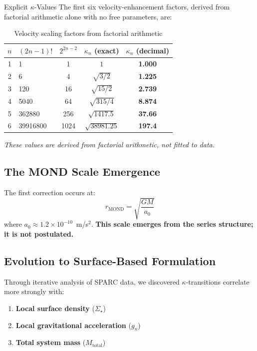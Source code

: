 \documentclass[11pt,a4paper]{article}
\theoremstyle{definition}
\theoremstyle{remark}
\begin{document}
		Explicit $\kappa$-Values
		The first six velocity-enhancement factors, derived from factorial arithmetic
		alone with no free parameters, are:
		
		\begin{table}[h]
			\centering
			\caption{Velocity scaling factors from factorial arithmetic}
			\label{tab:kappa}
			\begin{tabular}{@{}clccc@{}}
				\toprule
				$n$ & $(2n-1)!$ & $2^{2n-2}$ & $\kappa_n$ (exact) & $\kappa_n$ (decimal) \\
				\midrule
				1 & 1          & 1    & $1$                  & \textbf{1.000} \\
				2 & 6          & 4    & $\sqrt{3/2}$         & \textbf{1.225} \\
				3 & 120        & 16   & $\sqrt{15/2}$        & \textbf{2.739} \\
				4 & 5040       & 64   & $\sqrt{315/4}$       & \textbf{8.874} \\
				5 & 362880     & 256  & $\sqrt{1417.5}$      & \textbf{37.66} \\
				6 & 39916800   & 1024 & $\sqrt{38981.25}$    & \textbf{197.4} \\
				\bottomrule
			\end{tabular}
		\end{table}
		
		\noindent
		\emph{These values are derived from factorial arithmetic, not fitted to data.}
	
	\subsection{The MOND Scale Emergence}
	
	The first correction occurs at:
	\begin{equation}
		r_{\text{MOND}} = \sqrt{\frac{GM}{a_0}}
		\label{eq:mond_scale}
	\end{equation}
	where $a_0 \approx 1.2 \times 10^{-10}$~m/s$^2$. \textbf{This scale emerges from the series structure; it is not postulated.}
	
	\subsection{Evolution to Surface-Based Formulation}
	
	Through iterative analysis of SPARC data, we discovered $\kappa$-transitions correlate more strongly with:
	\begin{enumerate}
		\item \textbf{Local surface density} ($\Sigma_\star$)
		\item \textbf{Local gravitational acceleration} ($g_n$)
		\item \textbf{Total system mass} ($M_{\text{total}}$)
	\end{enumerate}
	
\end{document}
